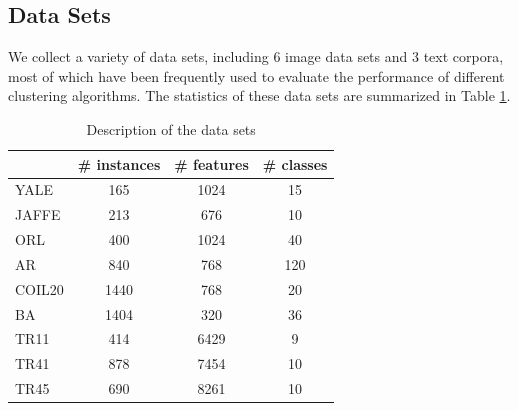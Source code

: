 \documentclass{article}
\begin{document}
\subsection{Data Sets}
We collect a variety of data sets, including 6 image data sets and 3 text corpora, most of which have been frequently used to evaluate the performance of different clustering algorithms. The statistics of these data sets are summarized in Table \ref{data}.

\begin{table}[h]
\centering
\caption{Description of the data sets}
\label{data}
\begin{tabular}{|l|c|c|c|}
\hline
&\textrm{\# instances}&\textrm{\# features}&\textrm{\# classes}\\\hline
\textrm{YALE}&165&1024&15\\\hline
\textrm{JAFFE}&213&676&10\\\hline
\textrm{ORL}&400&1024&40\\\hline
\textrm{AR}&840&768&120\\\hline
\textrm{COIL20}&1440&768&20\\\hline
\textrm{BA}&1404&320&36\\\hline
\textrm{TR11}&414&6429&9\\\hline
\textrm{TR41}&878&7454&10\\\hline
\textrm{TR45}&690&8261&10\\\hline
\end{tabular}
\end{table}
\end{document}
